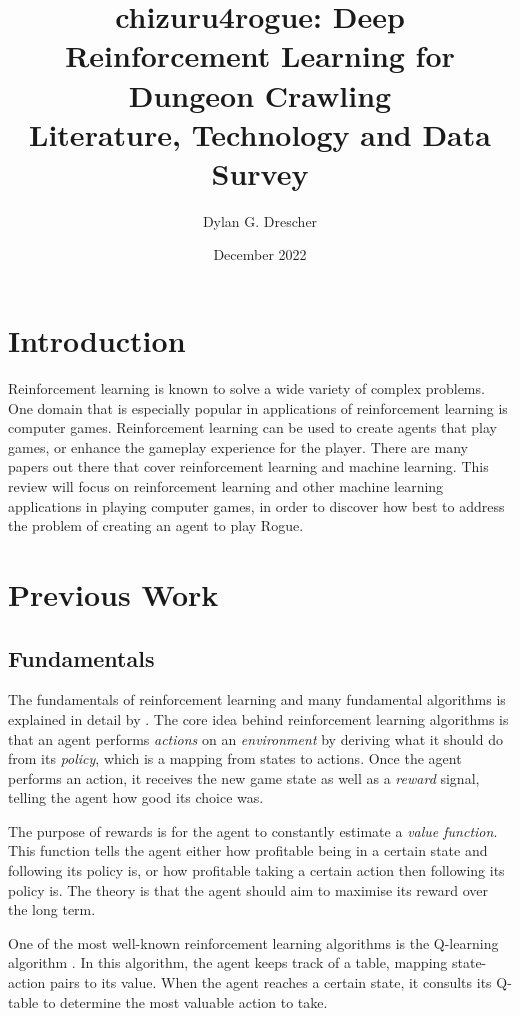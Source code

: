 \documentclass[11pt,a4paper]{article}
\begin{document}
\title{chizuru4rogue: Deep Reinforcement Learning for Dungeon Crawling \\[1ex] \large Literature, Technology and Data Survey}
\author{Dylan G. Drescher}
\date{December 2022}
\maketitle

\section{Introduction}
Reinforcement learning is known to solve a wide variety of complex problems. One domain that is especially popular in applications of reinforcement learning is computer games. Reinforcement learning can be used to create agents that play games, or enhance the gameplay experience for the player.
There are many papers out there that cover reinforcement learning and machine learning. This review will focus on reinforcement learning and other machine learning applications in playing computer games, in order to discover how best to address the problem of creating an agent to play Rogue.

\section{Previous Work}
\subsection{Fundamentals}
The fundamentals of reinforcement learning and many fundamental algorithms is explained in detail by \cite{sutton18}. The core idea behind reinforcement learning algorithms is that an agent performs \emph{actions} on an \emph{environment} by deriving what it should do from its \emph{policy}, which is a mapping from states to actions. Once the agent performs an action, it receives the new game state as well as a \emph{reward} signal, telling the agent how good its choice was.

The purpose of rewards is for the agent to constantly estimate a \emph{value function}. This function tells the agent either how profitable being in a certain state and following its policy is, or how profitable taking a certain action then following its policy is. The theory is that the agent should aim to maximise its reward over the long term.

One of the most well-known reinforcement learning algorithms is the Q-learning algorithm \cite[Chapter~6.5]{sutton18}. In this algorithm, the agent keeps track of a table, mapping state-action pairs to its value. When the agent reaches a certain state, it consults its Q-table to determine the most valuable action to take.
\end{document}
